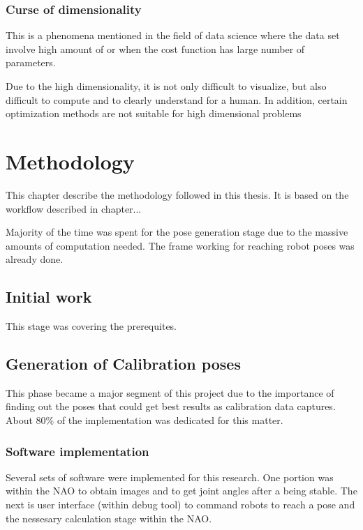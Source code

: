 \documentclass[english, printversion, nomenclature, notitle]{tuvisionthesis} %
\begin{document}
\subsection{Curse of dimensionality}
This is a phenomena mentioned in the field of data science where the data set involve high amount of or when the cost function has large number of parameters.

Due to the high dimensionality, it is not only difficult to visualize, but also difficult to compute and to clearly understand for a human. In addition, certain optimization methods are not suitable for high dimensional problems 

\chapter{Methodology}
This chapter describe the methodology followed in this thesis. It is based on the workflow described in chapter... 

Majority of the time was spent for the pose generation stage due to the massive amounts of computation needed. The frame working for reaching robot poses was already done. 

\section{Initial work}

This stage was covering the prerequites.

\section{Generation of Calibration poses}
This phase became a major segment of this project due to the importance of finding out the poses that could get best results as calibration data captures. About 80\% of the implementation was dedicated for this matter.

\subsection{Software implementation}

Several sets of software were implemented for this research. One portion was within the NAO to obtain images and to get joint angles after a being stable. The next is user interface (within debug tool) to command robots to reach a pose and the nessesary calculation stage within the NAO.
\end{document}
